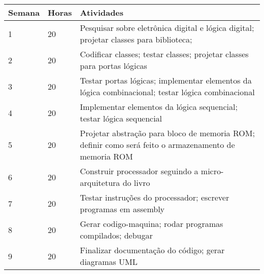 \begin{center}
\begin{tabular}{llp{}}
  Semana & Horas & Atividades\\ \hline \vspace{5pt}
  1 & 20 & Pesquisar sobre eletrônica digital e lógica digital; projetar classes para biblioteca;\\\vspace{5pt}
2 & 20 & Codificar classes; testar classes; projetar classes para portas lógicas\\\vspace{5pt}
3 & 20 & Testar portas lógicas; implementar elementos da lógica combinacional; testar lógica combinacional\\\vspace{5pt}
4 & 20 & Implementar elementos da lógica sequencial; testar lógica sequencial\\\vspace{5pt}
5 & 20 & Projetar abstração para bloco de memoria ROM; definir como será feito o armazenamento de memoria ROM\\\vspace{5pt}
6 & 20 & Construir processador seguindo a micro-arquitetura do livro\\\vspace{5pt}
7 & 20 & Testar instruções do processador; escrever programas em assembly\\\vspace{5pt}
8 & 20 & Gerar codigo-maquina; rodar programas compilados; debugar\\\vspace{5pt}
9 & 20 & Finalizar documentação do código; gerar diagramas UML\\\hline
\end{tabular}
\end{center}
